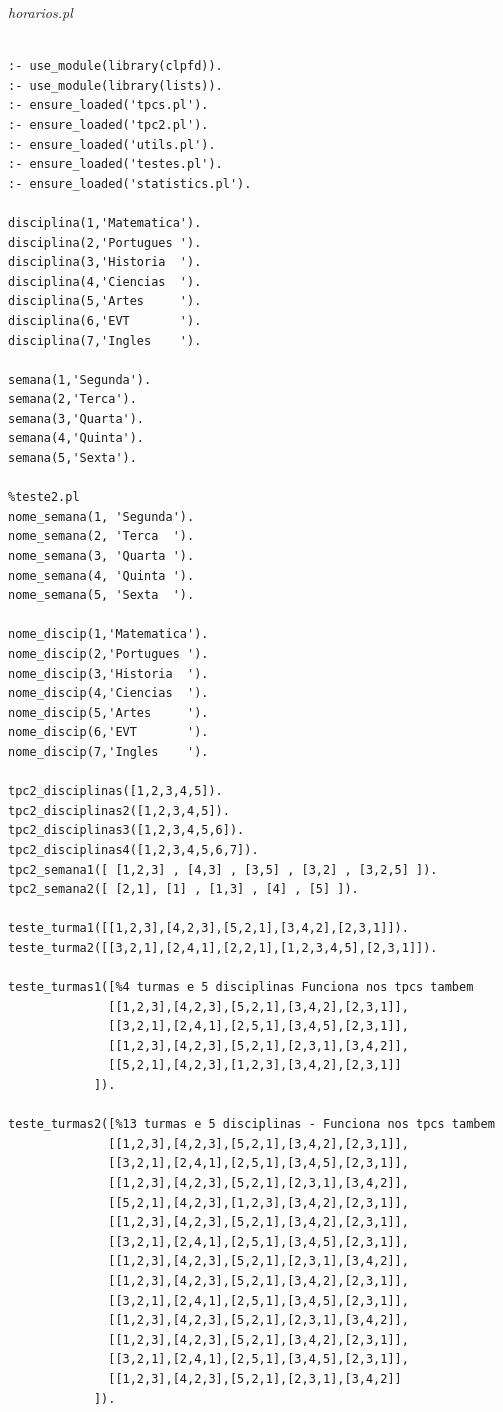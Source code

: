 \documentclass{llncs}
\newenvironment{changemargin}[2]{%
\begin{list}{}{%
\setlength{\topsep}{0pt}%
\setlength{\leftmargin}{#1}%
\setlength{\rightmargin}{#2}%
\setlength{\listparindent}{\parindent}%
\setlength{\itemindent}{\parindent}%
\setlength{\parsep}{\parskip}%
}%
\item[]}{
\end{list}}
\begin{document}
\noindent
{\it horarios.pl}
\begin{changemargin}{-3cm}{-4cm}
\begin{verbatim}

:- use_module(library(clpfd)).
:- use_module(library(lists)).
:- ensure_loaded('tpcs.pl').
:- ensure_loaded('tpc2.pl').
:- ensure_loaded('utils.pl').
:- ensure_loaded('testes.pl').
:- ensure_loaded('statistics.pl').

disciplina(1,'Matematica').
disciplina(2,'Portugues ').
disciplina(3,'Historia  ').
disciplina(4,'Ciencias  ').
disciplina(5,'Artes     ').
disciplina(6,'EVT       ').
disciplina(7,'Ingles    ').

semana(1,'Segunda').
semana(2,'Terca').
semana(3,'Quarta').
semana(4,'Quinta').
semana(5,'Sexta').

%teste2.pl
nome_semana(1, 'Segunda').
nome_semana(2, 'Terca  ').
nome_semana(3, 'Quarta ').
nome_semana(4, 'Quinta ').
nome_semana(5, 'Sexta  ').

nome_discip(1,'Matematica').
nome_discip(2,'Portugues ').
nome_discip(3,'Historia  ').
nome_discip(4,'Ciencias  ').
nome_discip(5,'Artes     ').
nome_discip(6,'EVT       ').
nome_discip(7,'Ingles    ').

tpc2_disciplinas([1,2,3,4,5]).
tpc2_disciplinas2([1,2,3,4,5]).
tpc2_disciplinas3([1,2,3,4,5,6]).
tpc2_disciplinas4([1,2,3,4,5,6,7]).
tpc2_semana1([ [1,2,3] , [4,3] , [3,5] , [3,2] , [3,2,5] ]).
tpc2_semana2([ [2,1], [1] , [1,3] , [4] , [5] ]).

teste_turma1([[1,2,3],[4,2,3],[5,2,1],[3,4,2],[2,3,1]]).
teste_turma2([[3,2,1],[2,4,1],[2,2,1],[1,2,3,4,5],[2,3,1]]).

teste_turmas1([%4 turmas e 5 disciplinas Funciona nos tpcs tambem
              [[1,2,3],[4,2,3],[5,2,1],[3,4,2],[2,3,1]],
              [[3,2,1],[2,4,1],[2,5,1],[3,4,5],[2,3,1]],
              [[1,2,3],[4,2,3],[5,2,1],[2,3,1],[3,4,2]],
              [[5,2,1],[4,2,3],[1,2,3],[3,4,2],[2,3,1]]
            ]).

teste_turmas2([%13 turmas e 5 disciplinas - Funciona nos tpcs tambem
              [[1,2,3],[4,2,3],[5,2,1],[3,4,2],[2,3,1]],
              [[3,2,1],[2,4,1],[2,5,1],[3,4,5],[2,3,1]],
              [[1,2,3],[4,2,3],[5,2,1],[2,3,1],[3,4,2]],
              [[5,2,1],[4,2,3],[1,2,3],[3,4,2],[2,3,1]],
              [[1,2,3],[4,2,3],[5,2,1],[3,4,2],[2,3,1]],
              [[3,2,1],[2,4,1],[2,5,1],[3,4,5],[2,3,1]],
              [[1,2,3],[4,2,3],[5,2,1],[2,3,1],[3,4,2]],
              [[1,2,3],[4,2,3],[5,2,1],[3,4,2],[2,3,1]],
              [[3,2,1],[2,4,1],[2,5,1],[3,4,5],[2,3,1]],
              [[1,2,3],[4,2,3],[5,2,1],[2,3,1],[3,4,2]],
              [[1,2,3],[4,2,3],[5,2,1],[3,4,2],[2,3,1]],
              [[3,2,1],[2,4,1],[2,5,1],[3,4,5],[2,3,1]],
              [[1,2,3],[4,2,3],[5,2,1],[2,3,1],[3,4,2]]
            ]).


\end{verbatim}
\end{changemargin}
\end{document}
